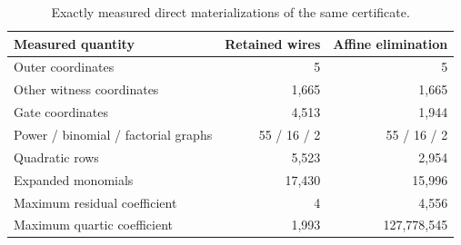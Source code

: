\begin{table}[h]
\centering
\begin{tabular}{lrr}
\toprule
Measured quantity & Retained wires & Affine elimination\\
\midrule
Outer coordinates & 5 & 5\\
Other witness coordinates & 1,665 & 1,665\\
Gate coordinates & 4,513 & 1,944\\
Power / binomial / factorial graphs & 55 / 16 / 2 & 55 / 16 / 2\\
Quadratic rows & 5,523 & 2,954\\
Expanded monomials & 17,430 & 15,996\\
Maximum residual coefficient & 4 & 4,556\\
Maximum quartic coefficient & 1,993 & 127,778,545\\
\bottomrule
\end{tabular}
\caption{Exactly measured direct materializations of the same certificate.}
\end{table}
